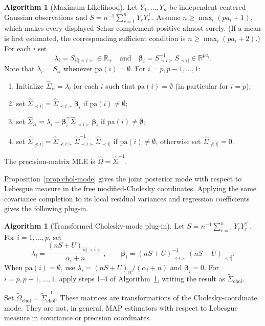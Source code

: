 \documentclass[12pt]{article}
\theoremstyle{plain}
\theoremstyle{definition}
\newtheorem{algo}[theorem]{Algorithm}
\theoremstyle{remark}
\begin{document}
\begin{algo}[Maximum Likelihood]\label{algo:mle}
Let $Y_1,\ldots,Y_n$ be independent centered Gaussian observations and
$S=n^{-1}\sum_{r=1}^nY_rY_r^{\top}$.  Assume
$n\geq\max_i(pa_i+1)$, which makes every displayed Schur complement
positive almost surely.  (If a mean is first estimated, the corresponding
sufficient condition is $n\geq\max_i(pa_i+2)$.)  For each $i$ set
\[
\lambda_i=S_{ii|\prec i\succ}\in\mathbb{R}_{+}\quad\text{and}\quad\boldsymbol{\beta}_i=S_{\prec i\succ}^{-1}S_{\prec i]}\in\mathbb{R}^{pa_i}.
\]
Note that $\lambda_i=S_{ii}$ whenever $\mathrm{pa}(i)=\emptyset$.  For
$i=p,p-1,\ldots,1$:
\begin{enumerate}
\item Initialize $\widehat{\Sigma}_{ii}=\lambda_i$ for each $i$ such that $\mathrm{pa}(i)=\emptyset$ (in particular for $i=p$);
\item set $\widehat{\Sigma}_{\prec i]}=\widehat{\Sigma}_{\prec i\succ}\boldsymbol{\beta}_i$ if $\mathrm{pa}(i)\ne \emptyset$;
\item set $\widehat{\Sigma}_{ii}=\lambda_i+\boldsymbol{\beta}_i^{\top}\widehat{\Sigma}_{\prec i\succ}\boldsymbol{\beta}_i$ if $\mathrm{pa}(i)\ne \emptyset$;
\item set $\widehat{\Sigma}_{\nprec i]}=\widehat{\Sigma}_{\nprec i\succ}\widehat{\Sigma}_{\prec i\succ}^{-1}\widehat{\Sigma}_{\prec i]}$ if $\mathrm{pa}(i)\ne \emptyset$, otherwise set $\widehat{\Sigma}_{\nprec i]}=0$. 
\end{enumerate}
\end{algo} 
The precision-matrix MLE is $\widehat\Omega=\widehat\Sigma^{-1}$.

Proposition~\ref{prop:chol-mode} gives the joint posterior mode with respect
to Lebesgue measure in the free modified-Cholesky coordinates.  Applying the
same covariance completion to its local residual variances and regression
coefficients gives the following plug-in.
\begin{algo}[Transformed Cholesky-mode plug-in]\label{algo:map}
Let $S=n^{-1}\sum_{r=1}^nY_rY_r^{\top}$.  For $i=1,\ldots,p$, set
\[
 \lambda_i=\frac{(nS+U)_{ii\mid\prec i\succ}}{\alpha_i+n},\qquad
 \boldsymbol\beta_i=(nS+U)_{\prec i\succ}^{-1}(nS+U)_{\prec i]}.
\]
When $\mathrm{pa}(i)=\emptyset$, use
$\lambda_i=(nS+U)_{ii}/(\alpha_i+n)$ and
$\boldsymbol\beta_i=0$.  For $i=p,p-1,\ldots,1$, apply steps 1--4 of
Algorithm~\ref{algo:mle}, writing the result as
$\widetilde\Sigma_{\mathrm{chol}}$.
\end{algo}
Set $\widetilde\Omega_{\mathrm{chol}}=
\widetilde\Sigma_{\mathrm{chol}}^{-1}$.  These matrices are transformations
of the Cholesky-coordinate mode.  They are not, in general, MAP estimators
with respect to Lebesgue measure in covariance or precision coordinates.
\end{document}
